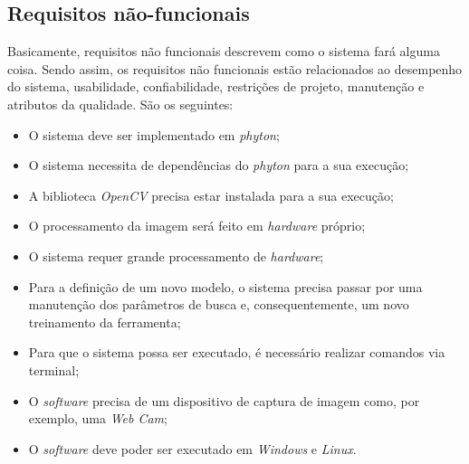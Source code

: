 \subsection{{Requisitos não-funcionais}}

Basicamente, requisitos não funcionais descrevem como o sistema fará alguma coisa. Sendo assim, os requisitos não funcionais estão relacionados ao desempenho do sistema, usabilidade, confiabilidade, restrições de projeto, manutenção e atributos da qualidade. São os seguintes:

\begin{itemize}
\raggedright \item O sistema deve ser implementado em \textit{phyton};

\raggedright \item O sistema necessita de dependências do \textit{phyton} para a sua execução;

\raggedright \item A biblioteca \textit{OpenCV} precisa estar instalada para a sua execução;

\raggedright \item O processamento da imagem será feito em \textit{hardware} próprio;

\raggedright \item O sistema requer grande processamento de \textit{hardware};

\raggedright \item Para a definição de um novo modelo, o sistema precisa passar por uma manutenção dos parâmetros de busca e, consequentemente, um novo treinamento da ferramenta;

\raggedright \item Para que o sistema possa ser executado, é necessário realizar comandos via terminal;

\raggedright \item O \textit{software} precisa de um dispositivo de captura de imagem como, por exemplo, uma \textit{Web Cam};

\raggedright \item O \textit{software} deve poder ser executado em \textit{Windows} e \textit{Linux}.

\end{itemize}
